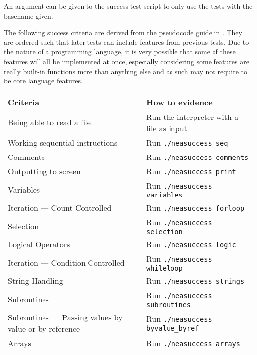 \documentclass{article}
\begin{document}
An argument can be given to the success test script to only use the tests with
the basename given.

The following success criteria are derived from the pseudocode guide in
\textcite{h446}. They are ordered such that later tests can include features
from previous tests. Due to the nature of a programming language, it is very
possible that some of these features will all be implemented at once,
especially considering some features are really built-in functions more than
anything else and as such may not require to be core language features.

\begin{table}
    \begin{adjustbox}{center}
        \begin{tabular}{|l|l|}
            \hline
            Criteria & How to evidence \\
            \hline
            Being able to read a file & Run the interpreter with a file as input \\
            \hline
            Working sequential instructions & Run \texttt{./neasuccess seq} \\
            \hline
            Comments & Run \texttt{./neasuccess comments} \\
            \hline
            Outputting to screen & Run \texttt{./neasuccess print} \\
            \hline
            Variables & Run \texttt{./neasuccess variables} \\
            \hline
            Iteration --- Count Controlled & Run \texttt{./neasuccess forloop}
            \\
            \hline
            Selection & Run \texttt{./neasuccess selection} \\
            \hline
            Logical Operators & Run \texttt{./neasuccess logic} \\
            \hline
            Iteration --- Condition Controlled & Run \texttt{./neasuccess
            whileloop} \\
            \hline
            String Handling & Run \texttt{./neasuccess strings} \\
            \hline
            Subroutines & Run \texttt{./neasuccess subroutines} \\
            \hline
            Subroutines --- Passing values by value or by reference & Run
            \texttt{./neasuccess byvalue\_byref} \\
            \hline
            Arrays & Run \texttt{./neasuccess arrays} \\

\end{tabular}
\end{adjustbox}
\end{table}
\end{document}

